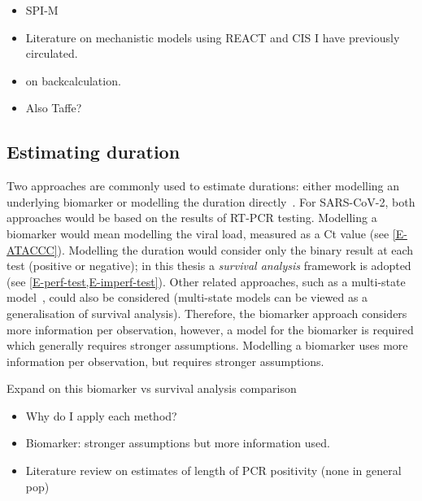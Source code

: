 \documentclass[thesis.tex]{subfiles}
\begin{document}


\begin{itemize}
    \item SPI-M
    \item Literature on mechanistic models using REACT and CIS I have previously circulated.
    \item \textcite{mccabeCISincidence,abbottCISincidence} on backcalculation.
    \item Also Taffe?
\end{itemize}

\subsection{Estimating duration}


Two approaches are commonly used to estimate durations: either modelling an underlying biomarker or modelling the duration directly~\autocite{sweetingEstimating}.
For SARS-CoV-2, both approaches would be based on the results of RT-PCR testing.
Modelling a biomarker would mean modelling the viral load, measured as a Ct value (see \cref{E-ATACCC}).
Modelling the duration would consider only the binary result at each test (positive or negative); in this thesis a \emph{survival analysis} framework is adopted (see \cref{E-perf-test,E-imperf-test}).
Other related approaches, such as a multi-state model~\autocite{jacksonMSM}, could also be considered (multi-state models can be viewed as a generalisation of survival analysis).
Therefore, the biomarker approach considers more information per observation, however, a model for the biomarker is required which generally requires stronger assumptions.
Modelling a biomarker uses more information per observation, but requires stronger assumptions.

Expand on this biomarker vs survival analysis comparison
\begin{itemize}
    \item Why do I apply each method?
    \item Biomarker: stronger assumptions but more information used.
    \item Literature review on estimates of length of PCR positivity (none in general pop)
\end{itemize}
\end{document}
